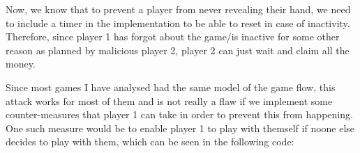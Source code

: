 \documentclass{article}
\begin{document}
    \noindent Now, we know that to prevent a player from
    never revealing their hand, we need to include a timer
    in the implementation to be able to reset in case of
    inactivity. Therefore, since player 1 has forgot about
    the game/is inactive for some other reason as planned by
    malicious player 2, player 2 can just wait and claim all
    the money.
    \newline
    
    \noindent Since most games I have analysed had the same
    model of the game flow, this attack works for most of
    them and is not really a flaw if we implement some
    counter-measures that player 1 can take in order to
    prevent this from happening. One such measure would be
    to enable player 1 to play with themself if noone else
    decides to play with them, which can be seen in the
    following code:
\end{document}
